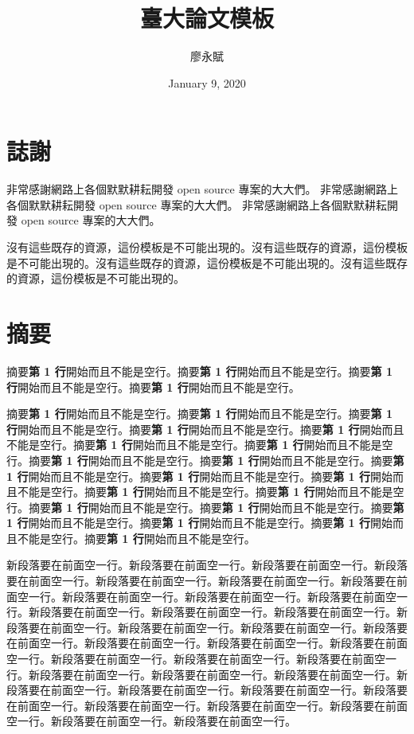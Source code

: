 \documentclass[oneside]{book}
\title{臺大論文模板}
\author{廖永賦}
\date{January 9, 2020}
\theoremstyle{definition}
\theoremstyle{definition}
\theoremstyle{definition}
\theoremstyle{remark}
\begin{document}


\clearpage
{}

{}



\chapter*{誌謝}
非常感謝網路上各個默默耕耘開發 open source 專案的大大們。
非常感謝網路上各個默默耕耘開發 open source 專案的大大們。
非常感謝網路上各個默默耕耘開發 open source 專案的大大們。

沒有這些既存的資源，這份模板是不可能出現的。沒有這些既存的資源，這份模板是不可能出現的。沒有這些既存的資源，這份模板是不可能出現的。沒有這些既存的資源，這份模板是不可能出現的。


\chapter*{摘要}
摘要\textbf{第 1 行}開始而且不能是空行。摘要\textbf{第 1 行}開始而且不能是空行。摘要\textbf{第 1 行}開始而且不能是空行。摘要\textbf{第 1 行}開始而且不能是空行。

摘要\textbf{第 1 行}開始而且不能是空行。摘要\textbf{第 1 行}開始而且不能是空行。摘要\textbf{第 1 行}開始而且不能是空行。摘要\textbf{第 1 行}開始而且不能是空行。摘要\textbf{第 1 行}開始而且不能是空行。摘要\textbf{第 1 行}開始而且不能是空行。摘要\textbf{第 1 行}開始而且不能是空行。摘要\textbf{第 1 行}開始而且不能是空行。摘要\textbf{第 1 行}開始而且不能是空行。摘要\textbf{第 1 行}開始而且不能是空行。摘要\textbf{第 1 行}開始而且不能是空行。摘要\textbf{第 1 行}開始而且不能是空行。摘要\textbf{第 1 行}開始而且不能是空行。摘要\textbf{第 1 行}開始而且不能是空行。摘要\textbf{第 1 行}開始而且不能是空行。摘要\textbf{第 1 行}開始而且不能是空行。摘要\textbf{第 1 行}開始而且不能是空行。摘要\textbf{第 1 行}開始而且不能是空行。摘要\textbf{第 1 行}開始而且不能是空行。摘要\textbf{第 1 行}開始而且不能是空行。

新段落要在前面空一行。新段落要在前面空一行。新段落要在前面空一行。新段落要在前面空一行。新段落要在前面空一行。新段落要在前面空一行。新段落要在前面空一行。新段落要在前面空一行。新段落要在前面空一行。新段落要在前面空一行。新段落要在前面空一行。新段落要在前面空一行。新段落要在前面空一行。新段落要在前面空一行。新段落要在前面空一行。新段落要在前面空一行。新段落要在前面空一行。新段落要在前面空一行。新段落要在前面空一行。新段落要在前面空一行。新段落要在前面空一行。新段落要在前面空一行。新段落要在前面空一行。新段落要在前面空一行。新段落要在前面空一行。新段落要在前面空一行。新段落要在前面空一行。新段落要在前面空一行。新段落要在前面空一行。新段落要在前面空一行。新段落要在前面空一行。新段落要在前面空一行。新段落要在前面空一行。新段落要在前面空一行。新段落要在前面空一行。
\end{document}
